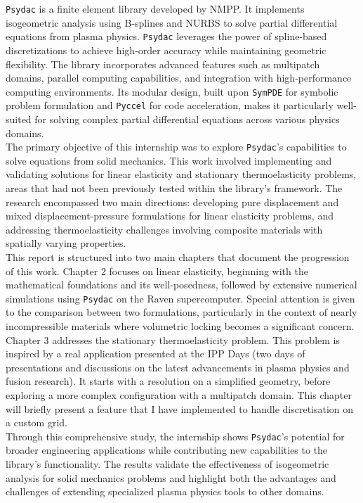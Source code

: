\documentclass[a4paper,12pt,twoside]{report}
\begin{document}
\texttt{Psydac} is a finite element library developed by NMPP. It implements isogeometric analysis using B-splines and NURBS to solve partial differential equations from plasma physics. \texttt{Psydac} leverages the power of spline-based discretizations to achieve high-order accuracy while maintaining geometric flexibility. The library incorporates advanced features such as multipatch domains, parallel computing capabilities, and integration with high-performance computing environments. Its modular design, built upon \texttt{SymPDE} for symbolic problem formulation and \texttt{Pyccel} for code acceleration, makes it particularly well-suited for solving complex partial differential equations across various physics domains.\\

The primary objective of this internship was to explore \texttt{Psydac}'s capabilities to solve equations from solid mechanics. This work involved implementing and validating solutions for linear elasticity and stationary thermoelasticity problems, areas that had not been previously tested within the library's framework. The research encompassed two main directions: developing pure displacement and mixed displacement-pressure formulations for linear elasticity problems, and addressing thermoelasticity challenges involving composite materials with spatially varying properties.\\

This report is structured into two main chapters that document the progression of this work. Chapter 2 focuses on linear elasticity, beginning with the mathematical foundations and its well-posedness, followed by extensive numerical simulations using \texttt{Psydac} on the Raven supercomputer. Special attention is given to the comparison between two formulations, particularly in the context of nearly incompressible materials where volumetric locking becomes a significant concern. Chapter 3 addresses the stationary thermoelasticity problem. This problem is inspired by a real application presented at the IPP Days (two days of presentations and discussions on the latest advancements in plasma physics and fusion research). It starts with a resolution on a simplified geometry, before exploring a more complex configuration with a multipatch domain. This chapter will briefly present a feature that I have implemented to handle discretisation on a custom grid.\\

Through this comprehensive study, the internship shows \texttt{Psydac}'s potential for broader engineering applications while contributing new capabilities to the library's functionality. The results validate the effectiveness of isogeometric analysis for solid mechanics problems and highlight both the advantages and challenges of extending specialized plasma physics tools to other domains.
\end{document}
